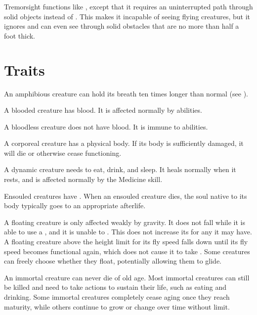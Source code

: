   Tremorsight functions like , except that it requires an uninterrupted path through solid objects instead of .
  This makes it incapable of seeing flying creatures, but it ignores  and can even see through solid obstacles that are no more than half a foot thick.

  \newpage
\section{Traits}\label{Traits}

  An amphibious creature can hold its breath ten times longer than normal (see ).

  A blooded creature has blood.
  It is affected normally by \atBlood abilities.

  A bloodless creature does not have blood.
  It is immune to \atBlood abilities.

  A corporeal creature has a physical body.
  If its body is sufficiently damaged, it will die or otherwise cease functioning.

  A dynamic creature needs to eat, drink, and sleep.
  It heals normally when it rests, and is affected normally by the Medicine skill.

   Ensouled creatures have .
  When an ensouled creature dies, the soul native to its body typically goes to an appropriate afterlife.

  A floating creature is only affected weakly by gravity.
  It does not fall while it is able to use a , and it is unable to .
  This does not increase its  for any  it may have.
  A floating creature above the height limit for its fly speed falls down until its fly speed becomes functional again, which does not cause it to take .
  Some creatures can freely choose whether they float, potentially allowing them to glide.

  An immortal creature can never die of old age.
  Most immortal creatures can still be killed and need to take actions to sustain their life, such as eating and drinking.
  Some immortal creatures completely cease aging once they reach maturity, while others continue to grow or change over time without limit.

